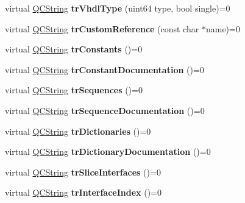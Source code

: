 \begin{DoxyCompactItemize}
virtual \mbox{\hyperlink{class_q_c_string}{Q\+C\+String}} {\bfseries tr\+Vhdl\+Type} (uint64 type, bool single)=0
\item 
\mbox{\label{class_translator_af53928acaaf212a6147ef467253f04eb}} 
virtual \mbox{\hyperlink{class_q_c_string}{Q\+C\+String}} {\bfseries tr\+Custom\+Reference} (const char $\ast$name)=0
\item 
\mbox{\label{class_translator_a6666670ff2d8a1f1e25a9d3f64bb2ea5}} 
virtual \mbox{\hyperlink{class_q_c_string}{Q\+C\+String}} {\bfseries tr\+Constants} ()=0
\item 
\mbox{\label{class_translator_a3e0a389bd271153054fddec917bf4945}} 
virtual \mbox{\hyperlink{class_q_c_string}{Q\+C\+String}} {\bfseries tr\+Constant\+Documentation} ()=0
\item 
\mbox{\label{class_translator_a297730e06678d2e3c0b80742719dacbd}} 
virtual \mbox{\hyperlink{class_q_c_string}{Q\+C\+String}} {\bfseries tr\+Sequences} ()=0
\item 
\mbox{\label{class_translator_aa27edcf1b2595996013abc2f9252e197}} 
virtual \mbox{\hyperlink{class_q_c_string}{Q\+C\+String}} {\bfseries tr\+Sequence\+Documentation} ()=0
\item 
\mbox{\label{class_translator_ae08f4f9023cb1e1d26f1c127d7897771}} 
virtual \mbox{\hyperlink{class_q_c_string}{Q\+C\+String}} {\bfseries tr\+Dictionaries} ()=0
\item 
\mbox{\label{class_translator_ab93b3227e857cd5104b6118f1ffa8682}} 
virtual \mbox{\hyperlink{class_q_c_string}{Q\+C\+String}} {\bfseries tr\+Dictionary\+Documentation} ()=0
\item 
\mbox{\label{class_translator_a609ebeb1557b22a4faeed69900017551}} 
virtual \mbox{\hyperlink{class_q_c_string}{Q\+C\+String}} {\bfseries tr\+Slice\+Interfaces} ()=0
\item 
\mbox{\label{class_translator_a2f5a7c7b48a8581076a0e2884e39cd65}} 
virtual \mbox{\hyperlink{class_q_c_string}{Q\+C\+String}} {\bfseries tr\+Interface\+Index} ()=0

\end{DoxyCompactItemize}
